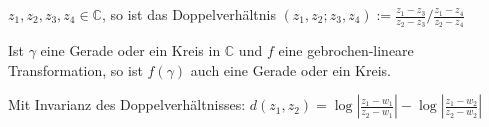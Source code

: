 \begin{defi}[Doppelverhältnis]
    $z_1,z_2,z_3,z_4 \in \mathbb{C}$, so ist das Doppelverhältnis
    $(z_1,z_2;z_3,z_4) := \frac{z_1-z_3}{z_2-z_3} / \frac{z_1-z_4}{z_2-z_4}$
\end{defi}

\begin{satz}
    Ist $\gamma$ eine Gerade oder ein Kreis in $\mathbb{C}$ und 
    $f$ eine gebrochen-lineare Transformation,
    so ist $f(\gamma)$ auch eine Gerade oder ein Kreis.
\end{satz}

\begin{bem}
    Mit Invarianz des Doppelverhältnisses:
    $d(z_1,z_2) = \log|\frac{z_1-w_1}{z_2-w_1}| - \log|\frac{z_1-w_2}{z_2-w_2}|$
\end{bem}
